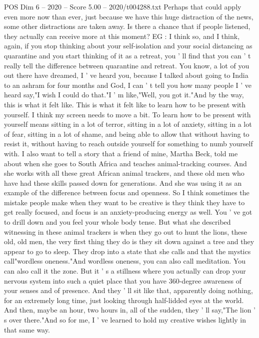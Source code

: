 \begin{textsample}{POS Dim 6 – 2020 – Score 5.00 – 2020/t004288.txt}
Perhaps that could apply even more now than ever, just because we have this huge distraction of the news, some other distractions are taken away.
Is there a chance that if people listened, they actually can receive more at this moment?
EG : I think so, and I think, again, if you stop thinking about your self-isolation and your social distancing as quarantine and you start thinking of it as a retreat, you ' ll find that you can ' t really tell the difference between quarantine and retreat.
You know, a lot of you out there have dreamed, I ' ve heard you, because I talked about going to India to an ashram for four months and God, I can ' t tell you how many people I ' ve heard say,"I wish I could do that."I ' m like,"Well, you got it."And by the way, this is what it felt like.
This is what it felt like to learn how to be present with yourself.
I think my screen needs to move a bit.
To learn how to be present with yourself means sitting in a lot of terror, sitting in a lot of anxiety, sitting in a lot of fear, sitting in a lot of shame, and being able to allow that without having to resist it, without having to reach outside yourself for something to numb yourself with.
I also want to tell a story that a friend of mine, Martha Beck, told me about when she goes to South Africa and teaches animal-tracking courses.
And she works with all these great African animal trackers, and these old men who have had these skills passed down for generations.
And she was using it as an example of the difference between focus and openness.
So I think sometimes the mistake people make when they want to be creative is they think they have to get really focused, and focus is an anxiety-producing energy as well.
You ' ve got to drill down and you feel your whole body tense.
But what she described witnessing in these animal trackers is when they go out to hunt the lions, these old, old men, the very first thing they do is they sit down against a tree and they appear to go to sleep.
They drop into a state that she calls and that the mystics call"wordless oneness."And wordless oneness, you can also call meditation.
You can also call it the zone.
But it ' s a stillness where you actually can drop your nervous system into such a quiet place that you have 360-degree awareness of your senses and of presence.
And they ' ll sit like that, apparently doing nothing, for an extremely long time, just looking through half-lidded eyes at the world.
And then, maybe an hour, two hours in, all of the sudden, they ' ll say,"The lion ' s over there."And so for me, I ' ve learned to hold my creative wishes lightly in that same way.

\end{textsample}
